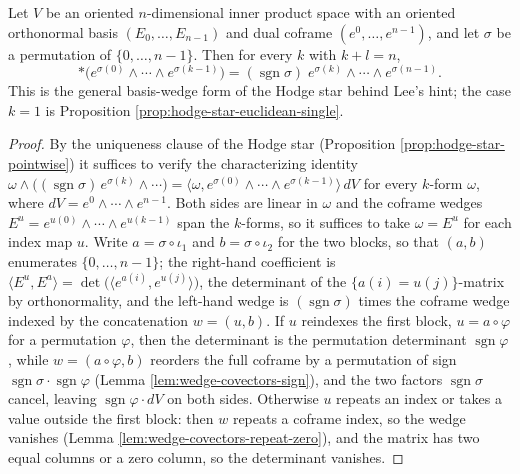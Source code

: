 \begin{proposition}
\label{prop:hodge-star-basis-wedge}
\leanok
{}
Let $V$ be an oriented $n$-dimensional inner product space with an oriented orthonormal basis $(E_0,\ldots,E_{n-1})$ and dual coframe $(e^0,\ldots,e^{n-1})$, and let $\sigma$ be a permutation of $\{0,\ldots,n-1\}$. Then for every $k$ with $k + l = n$,
\[
{*}\bigl(e^{\sigma(0)} \wedge \cdots \wedge e^{\sigma(k-1)}\bigr)
  = (\operatorname{sgn}\sigma)\; e^{\sigma(k)} \wedge \cdots \wedge e^{\sigma(n-1)}.
\]
This is the general basis-wedge form of the Hodge star behind Lee's hint; the case $k = 1$ is Proposition \ref{prop:hodge-star-euclidean-single}.
\end{proposition}
\begin{proof}
\leanok
{}
By the uniqueness clause of the Hodge star (Proposition \ref{prop:hodge-star-pointwise}) it suffices to verify the characterizing identity $\omega \wedge \bigl((\operatorname{sgn}\sigma)\,e^{\sigma(k)} \wedge \cdots\bigr) = \langle \omega, e^{\sigma(0)} \wedge \cdots \wedge e^{\sigma(k-1)}\rangle\, dV$ for every $k$-form $\omega$, where $dV = e^0 \wedge \cdots \wedge e^{n-1}$. Both sides are linear in $\omega$ and the coframe wedges $E^u = e^{u(0)} \wedge \cdots \wedge e^{u(k-1)}$ span the $k$-forms, so it suffices to take $\omega = E^u$ for each index map $u$. Write $a = \sigma \circ \iota_1$ and $b = \sigma \circ \iota_2$ for the two blocks, so that $(a,b)$ enumerates $\{0,\ldots,n-1\}$; the right-hand coefficient is $\langle E^u, E^a\rangle = \det\bigl(\langle e^{a(i)}, e^{u(j)}\rangle\bigr)$, the determinant of the $\{a(i) = u(j)\}$-matrix by orthonormality, and the left-hand wedge is $(\operatorname{sgn}\sigma)$ times the coframe wedge indexed by the concatenation $w = (u, b)$. If $u$ reindexes the first block, $u = a \circ \varphi$ for a permutation $\varphi$, then the determinant is the permutation determinant $\operatorname{sgn}\varphi$, while $w = (a\circ\varphi, b)$ reorders the full coframe by a permutation of sign $\operatorname{sgn}\sigma \cdot \operatorname{sgn}\varphi$ (Lemma \ref{lem:wedge-covectors-sign}), and the two factors $\operatorname{sgn}\sigma$ cancel, leaving $\operatorname{sgn}\varphi \cdot dV$ on both sides. Otherwise $u$ repeats an index or takes a value outside the first block: then $w$ repeats a coframe index, so the wedge vanishes (Lemma \ref{lem:wedge-covectors-repeat-zero}), and the matrix has two equal columns or a zero column, so the determinant vanishes.
\end{proof}

